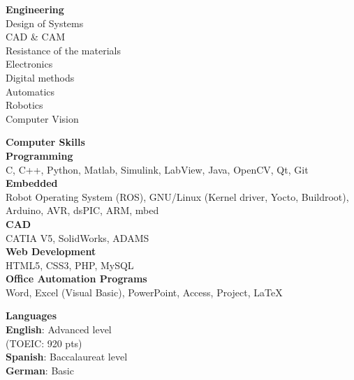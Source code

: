 \documentclass[a4paper,11pt,final]{memoir}
\newcommand{\SmallSep}{\vspace{0.5em}}
\newcommand{\SkillSection}[1]
	{\normalsize{\textbf{#1\\}}\normalfont\small}%
\newcommand{\SkillItem}[1]
{\vspace{0.25em}\textbf{\color{RoyalBlue} #1}\normalfont}
\begin{document}
\begin{flushleft}
\SkillSection{Engineering}
Design of Systems\\
CAD \& CAM\\
Resistance of the materials\\
Electronics\\
Digital methods\\
Automatics\\
Robotics\\
Computer Vision
\SmallSep

\SkillSection{Computer Skills}
\vspace{-0.25em}
\SkillItem{Programming}\\
C, C++, Python, Matlab, Simulink, LabView, Java, OpenCV, Qt, Git\\
\SkillItem{Embedded}\\
Robot Operating System (ROS), GNU/Linux (Kernel driver, Yocto, Buildroot), Arduino, AVR, dsPIC, ARM, mbed\\
\SkillItem{CAD}\\
CATIA V5, SolidWorks, ADAMS\\
\SkillItem{Web Development}\\
HTML5, CSS3, PHP, MySQL\\
\SkillItem{Office Automation Programs}\\
Word, Excel (Visual Basic), PowerPoint, Access, Project, \LaTeX\\
\SmallSep

\SkillSection{Languages}
\vspace{-0.25em}
\SkillItem{English}: Advanced level\\
(TOEIC: 920 pts)\\
\SkillItem{Spanish}: Baccalaureat level\\
\SkillItem{German}: Basic
\SmallSep


\end{flushleft}
\end{document}

